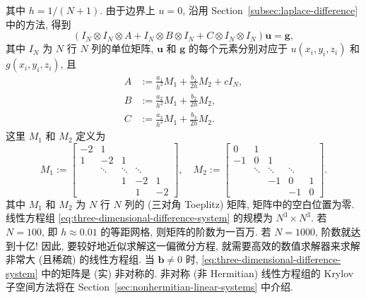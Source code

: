 {其中 $h=1/(N+1)$. 由于边界上 $u=0$, 沿用 Section\ \ref{subsec:laplace-difference} 中的方法, 得到}
\begin{equation}\label{eq:three-dimensional-difference-system}
(I_N\otimes I_N\otimes A+I_N\otimes B\otimes I_N+C\otimes I_N\otimes I_N)\boldsymbol{u}=\boldsymbol{g},
\end{equation}
{其中 $I_N$ 为 $N$ 行 $N$ 列的单位矩阵, $\boldsymbol{u}$ 和 $\boldsymbol{g}$ 的每个元素分别对应于 $u(x_i,y_i,z_i)$ 和 $g(x_i,y_i,z_i)$, 且}
\[\begin{aligned}
A&:=\frac{a_1}{h^2}M_1+\frac{b_1}{2h}M_2+cI_N,\\
B&:=\frac{a_2}{h^2}M_1+\frac{b_2}{2h}M_2,\\
C&:=\frac{a_3}{h^2}M_1+\frac{b_3}{2h}M_2.
\end{aligned}\]
{这里 $M_1$ 和 $M_2$ 定义为}
\[M_1:=\begin{bmatrix}-2&1&&&\\1&-2&1&&\\&\ddots&\ddots&\ddots&\\&&1&-2&1\\&&&1&-2\end{bmatrix},\quad
M_2:=\begin{bmatrix}0&1&&&\\-1&0&1&&\\&\ddots&\ddots&\ddots&\\&&-1&0&1\\&&&-1&0\end{bmatrix}.\]
{其中 $M_1$ 和 $M_2$ 为 $N$ 行 $N$ 列的 (三对角 Toeplitz) 矩阵, 矩阵中的空白位置为零.}
{线性方程组 \eqref{eq:three-dimensional-difference-system} 的规模为 $N^3\times N^3$. 若 $N=100$, 即 $h\approx0.01$ 的等距网格, 则矩阵的阶数为一百万. 若 $N=1000$, 阶数就达到十亿! 因此, 要较好地近似求解这一偏微分方程, 就需要高效的数值求解器来求解非常大 (且稀疏) 的线性方程组.}
{当 $\boldsymbol{b}\ne0$ 时, \eqref{eq:three-dimensional-difference-system} 中的矩阵是 (实) 非对称的. 非对称 (非 Hermitian) 线性方程组的 Krylov 子空间方法将在 Section\ \ref{sec:nonhermitian-linear-systems} 中介绍.}
